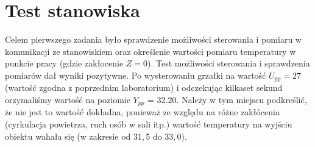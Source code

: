 \chapter{Test stanowiska}
Celem pierwszego zadania było sprawdzenie możliwości sterowania i pomiaru w komunikacji
ze stanowiskiem oraz określenie wartości pomiaru temperatury w punkcie pracy
(gdzie zakłocenie $Z = 0$).
Test możliwości sterowania i sprawdzenia pomiarów dał wyniki pozytywne.
Po wysterowaniu grzałki na wartość $U_{pp} = 27$ (wartość zgodna z poprzednim laboratorium) i odczekując
kilkaset sekund orzymaliśmy wartość na poziomie $Y_{pp}$ = 32.20. Należy w tym
miejscu podkreślić, że nie jest to wartość dokładna, ponieważ ze względu na różne
zakłócenia (cyrkulacja powietrza, ruch osób w sali itp.) wartość temperatury na
wyjściu obiektu wahała się (w zakresie od $31,5$ do $33,0$).
